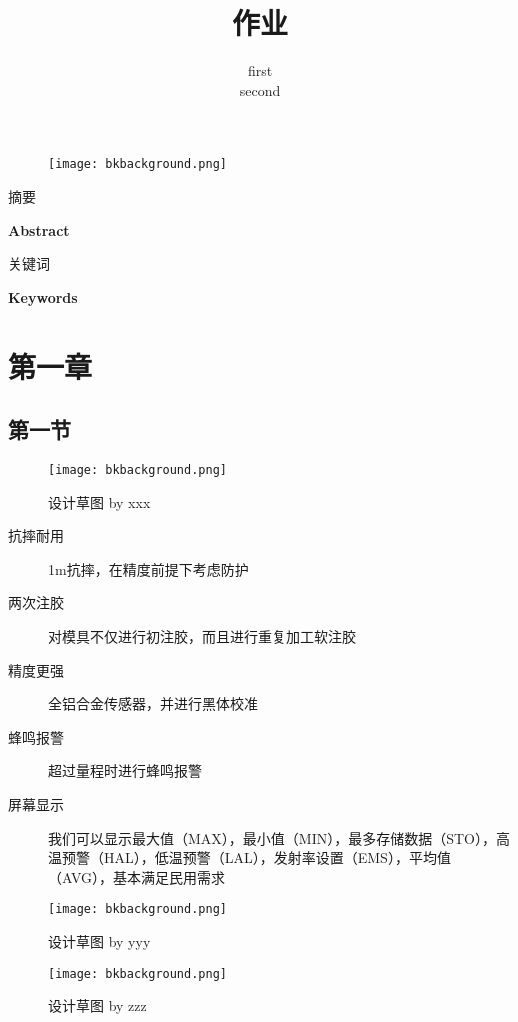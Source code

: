 \documentclass[hyperref,UTF8,12px,a4paper]{ctexart} %
\title{作业}
\author{first\\
second}
\numberwithin{equation}{section} %
\begin{document}
\maketitle
\begin{figure}[!htb]
	\centering
	\texttt{[image: bkbackground.png]}
\end{figure}
\thispagestyle{fancy} %

{\noindent \Large \heiti 摘要}\\
\par
{\noindent \Large \textbf{Abstract}}\\
\par
{\noindent \Large \heiti 关键词}\\
\par
{\noindent \Large \textbf{Keywords}}\\
\section{第一章}
\subsection{第一节}
\newpage
\begin{figure}[!htb]
	\centering
    \texttt{[image: bkbackground.png]}
    \caption{设计草图 by xxx}
\end{figure}

\begin{description}
    \item[抗摔耐用] 1m抗摔，在精度前提下考虑防护
    \item[两次注胶] 对模具不仅进行初注胶，而且进行重复加工软注胶
    \item[精度更强] 全铝合金传感器，并进行黑体校准
    \item[蜂鸣报警] 超过量程时进行蜂鸣报警
    \item[屏幕显示] 我们可以显示最大值（MAX），最小值（MIN），最多存储数据（STO），高温预警（HAL），低温预警（LAL），发射率设置（EMS），平均值（AVG），基本满足民用需求
\end{description}

\newpage
\begin{figure}[!htb]
	\centering
    \texttt{[image: bkbackground.png]}
    \caption{设计草图 by yyy}
\end{figure}

\newpage
\begin{figure}[!htb]
	\centering
    \texttt{[image: bkbackground.png]}
    \caption{设计草图 by zzz}
\end{figure}

\begin{comment}
\begin{itemize}
    \item 加入激光指示，远距离自动放大激光点大小
    \item 握柄采用流线型设计
    \item 过一段时间后可以自动关机
\end{itemize}
\end{comment}
\end{document}
